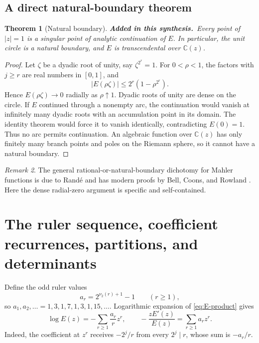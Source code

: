 \documentclass[11pt,oneside]{article}
\numberwithin{equation}{section}
\newtheorem{theorem}{Theorem}[section]
\theoremstyle{definition}
\theoremstyle{remark}
\newtheorem{remark}[theorem]{Remark}
\newcommand{\C}{\mathbb C}
\newcommand{\vtwo}{\nu_2}
\newcommand{\newmaterial}{\textcolor{AtlasBlue}{\textbf{Added in this synthesis.}}\ }
\begin{document}
\subsection{A direct natural-boundary theorem}

\begin{theorem}[Natural boundary]
\newmaterial Every point of \(|z|=1\) is a singular point of analytic
continuation of \(E\).  In particular, the unit circle is a natural boundary,
and \(E\) is transcendental over \(\C(z)\).
\end{theorem}

\begin{proof}
Let \(\zeta\) be a dyadic root of unity, say \(\zeta^{2^r}=1\).  For
\(0<\rho<1\), the factors with \(j\ge r\) are real numbers in \([0,1]\), and
\[
 |E(\rho\zeta)|
 \le 2^r(1-\rho^{2^r}).
\]
Hence \(E(\rho\zeta)\to0\) radially as \(\rho\uparrow1\).  Dyadic roots of
unity are dense on the circle.  If \(E\) continued through a nonempty arc,
the continuation would vanish at infinitely many dyadic roots with an
accumulation point in its domain.  The identity theorem would force it to
vanish identically, contradicting \(E(0)=1\).  Thus no arc permits
continuation.  An algebraic function over \(\C(z)\) has only finitely many
branch points and poles on the Riemann sphere, so it cannot have a natural
boundary.
\end{proof}

\begin{remark}
The general rational-or-natural-boundary dichotomy for Mahler functions is due
to Rand\'e and has modern proofs by Bell, Coons, and Rowland
\cite{BellCoonsRowland}.  Here the dense radial-zero argument is specific and
self-contained.
\end{remark}

\section{The ruler sequence, coefficient recurrences, partitions, and determinants}
\label{sec:ruler}

Define the odd ruler values
\begin{equation}
 a_r=2^{\vtwo(r)+1}-1\qquad(r\ge1),
 \label{eq:ruler-a}
\end{equation}
so \(a_1,a_2,\ldots=1,3,1,7,1,3,1,15,\ldots\).  Logarithmic expansion of
\eqref{eq:E-product} gives
\begin{equation}
 \boxed{\log E(z)=-\sum_{r\ge1}\frac{a_r}{r}z^r,}
 \qquad
 -\frac{zE'(z)}{E(z)}=\sum_{r\ge1}a_rz^r.
 \label{eq:log-E-ruler}
\end{equation}
Indeed, the coefficient at \(z^r\) receives \(-2^j/r\) from every
\(2^j\mid r\), whose sum is \(-a_r/r\).
\end{document}
